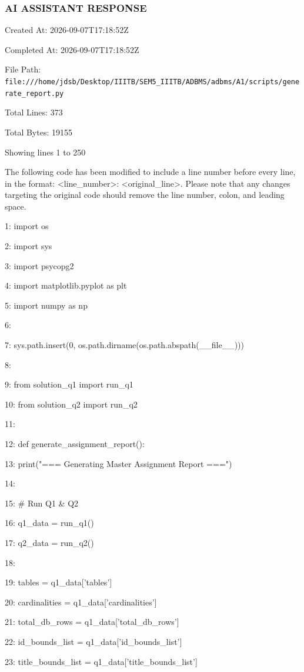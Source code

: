 \documentclass[11pt,a4paper]{article}
\begin{document}
{\subsubsection{AI ASSISTANT RESPONSE}

Created At: 2026-09-07T17:18:52Z

Completed At: 2026-09-07T17:18:52Z

File Path: \texttt{file:///home/jdsb/Desktop/IIITB/SEM5\_IIITB/ADBMS/adbms/A1/scripts/generate\_report.py}

Total Lines: 373

Total Bytes: 19155

Showing lines 1 to 250

The following code has been modified to include a line number before every line, in the format: <line\_number>: <original\_line>. Please note that any changes targeting the original code should remove the line number, colon, and leading space.

1: import os

2: import sys

3: import psycopg2

4: import matplotlib.pyplot as plt

5: import numpy as np

6:

7: sys.path.insert(0, os.path.dirname(os.path.abspath(\_\_file\_\_)))

8:

9: from solution\_q1 import run\_q1

10: from solution\_q2 import run\_q2

11:

12: def generate\_assignment\_report():

13:     print("=== Generating Master Assignment Report ===")

14:

15:     \# Run Q1 \& Q2

16:     q1\_data = run\_q1()

17:     q2\_data = run\_q2()

18:

19:     tables = q1\_data['tables']

20:     cardinalities = q1\_data['cardinalities']

21:     total\_db\_rows = q1\_data['total\_db\_rows']

22:     id\_bounds\_list = q1\_data['id\_bounds\_list']

23:     title\_bounds\_list = q1\_data['title\_bounds\_list']

}
\end{document}
